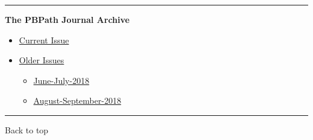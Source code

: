 \documentclass[]{article}
\begin{document}
\begin{center}\rule{0.5\linewidth}{\linethickness}\end{center}

\textbf{The PBPath Journal Archive}

\begin{itemize}
\item
  \href{http://pbpath.org/journal-watch/}{Current Issue}
\item
  \href{http://pbpath.org/journal-watch-archive/}{Older Issues}

  \begin{itemize}
  \item
    \href{http://pbpath.org/pbpath-journal-watch-june-july-2018/}{June-July-2018}
  \item
    \href{http://pbpath.org/pbpath-journal-watch-august-september-2018/}{August-September-2018}
  \end{itemize}
\end{itemize}

\begin{center}\rule{0.5\linewidth}{\linethickness}\end{center}

Back to top

\pagebreak
\end{document}

